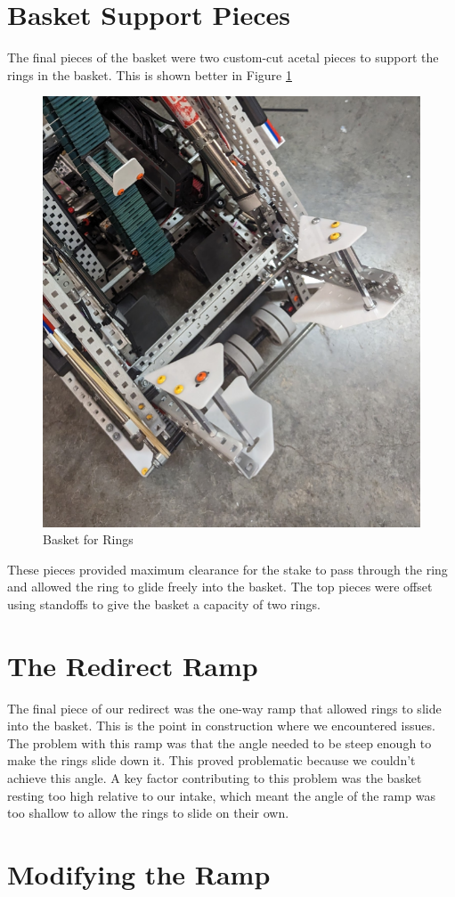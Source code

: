 \section*{Basket Support Pieces}

The final pieces of the basket were two custom-cut acetal pieces to support the rings in the basket. This is shown better in Figure \ref{fig:redirect-basket}
\begin{figure}[H]
    \centering
    \includegraphics[width=0.5\linewidth]{images/Redirect-Basket.png}
    \caption{Basket for Rings}
    \label{fig:redirect-basket}
\end{figure}
These pieces provided maximum clearance for the stake to pass through the ring and allowed the ring to glide freely into the basket. The top pieces were offset using standoffs to give the basket a capacity of two rings. 

\section*{The Redirect Ramp}

The final piece of our redirect was the one-way ramp that allowed rings to slide into the basket. This is the point in construction where we encountered issues. The problem with this ramp was that the angle needed to be steep enough to make the rings slide down it. This proved problematic because we couldn't achieve this angle. A key factor contributing to this problem was the basket resting too high relative to our intake, which meant the angle of the ramp was too shallow to allow the rings to slide on their own.

\section*{Modifying the Ramp}

